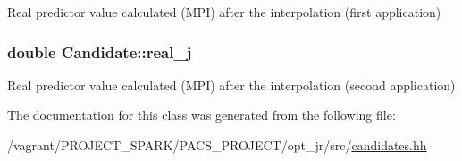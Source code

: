 Real predictor value calculated (M\-P\-I) after the interpolation (first application) 

\hypertarget{classCandidate_ad7e4bca76815c11f378f005baa93bffb}{
\subsubsection[{real\-\_\-j}]{\setlength{\rightskip}{0pt plus 5cm}double Candidate\-::real\-\_\-j}}\label{classCandidate_ad7e4bca76815c11f378f005baa93bffb}


Real predictor value calculated (M\-P\-I) after the interpolation (second application) 



The documentation for this class was generated from the following file\-:\begin{DoxyCompactItemize}
\item 
/vagrant/\-P\-R\-O\-J\-E\-C\-T\-\_\-\-S\-P\-A\-R\-K/\-P\-A\-C\-S\-\_\-\-P\-R\-O\-J\-E\-C\-T/opt\-\_\-jr/src/\hyperlink{candidates_8hh}{candidates.\-hh}\end{DoxyCompactItemize}
